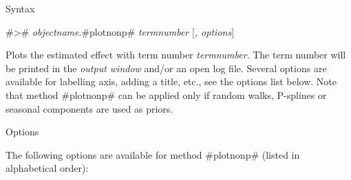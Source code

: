 \begin{stanza}{Syntax}

#># {\em objectname}.#plotnonp# {\em termnumber} [{\em , options}]


Plots the estimated effect with term number {\em termnumber}. The
term number will be printed in the {\em output window} and/or an
open log file. Several options are available for labelling axis,
adding a title, etc., see the options list below. Note that method
#plotnonp# can be applied only if random walks, P-splines or
seasonal components are used as priors.

\end{stanza}

\begin{stanza}{Options}

The following options are available for method #plotnonp# (listed
in alphabetical order):

\end{stanza}

